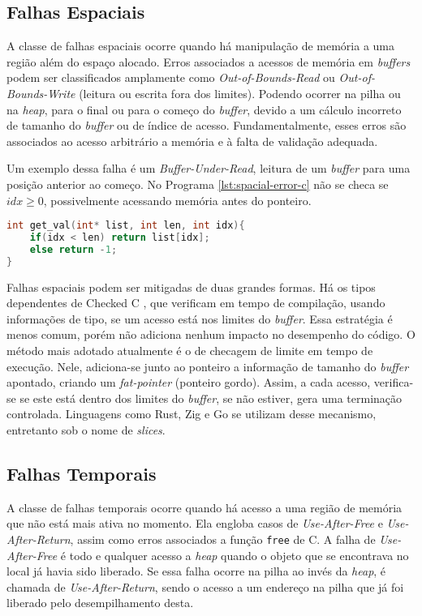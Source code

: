 \subsection{Falhas Espaciais}
\label{sec:mem-error:spacial}

A classe de falhas espaciais ocorre quando há manipulação de memória a uma região além do espaço alocado. Erros associados a acessos de memória em \emph{buffers} podem ser classificados amplamente como \emph{Out-of-Bounds-Read} ou \emph{Out-of-Bounds-Write} (leitura ou escrita fora dos limites). Podendo ocorrer na pilha ou na \emph{heap}, para o final ou para o começo do \emph{buffer}, devido a um cálculo incorreto de tamanho do \emph{buffer} ou de índice de acesso.  Fundamentalmente, esses erros são associados ao acesso arbitrário a memória e à falta de validação adequada.

Um exemplo dessa falha é um \emph{Buffer-Under-Read}, 
leitura de um \emph{buffer} para uma posição anterior ao começo. No Programa \ref{lst:spacial-error-c}
não se checa se $idx \ge 0$, possivelmente acessando memória antes do ponteiro.

\begin{lstlisting}[language=C ,label={lst:spacial-error-c}, caption=Exemplo de uma Falha Espacial]
int get_val(int* list, int len, int idx){
	if(idx < len) return list[idx];
 	else return -1;
}
\end{lstlisting}

Falhas espaciais podem ser mitigadas de duas grandes formas. Há os tipos dependentes de Checked C \cite{CHECKEDC}, que verificam em tempo de compilação, usando informações de tipo, se um acesso está nos limites do \emph{buffer}. Essa estratégia é menos comum, porém não adiciona nenhum impacto no desempenho do código. 
O método mais adotado atualmente é o de checagem de limite em tempo de execução. Nele, adiciona-se junto ao ponteiro a informação de tamanho do \emph{buffer} apontado, criando um \emph{fat-pointer} (ponteiro gordo). Assim, a cada acesso, verifica-se se este está dentro dos limites do \emph{buffer}, se não estiver, gera uma terminação controlada. Linguagens como Rust, Zig e Go se utilizam desse mecanismo, entretanto sob o nome de \emph{slices}.


\subsection{Falhas Temporais}
\label{sec:mem-error:temporal}

A classe de falhas temporais ocorre quando há acesso a uma região de memória que não está mais ativa no momento. Ela engloba casos de \emph{Use-After-Free} e \emph{Use-After-Return}, assim como erros associados a função \lstinline[language=C]|free| de C. A falha de \emph{Use-After-Free} é todo e qualquer acesso a \emph{heap} quando o objeto que se encontrava no local já havia sido liberado. Se essa falha ocorre na pilha ao invés da \emph{heap}, é chamada de \emph{Use-After-Return}, sendo o acesso a um endereço na pilha que já foi liberado pelo desempilhamento desta.

